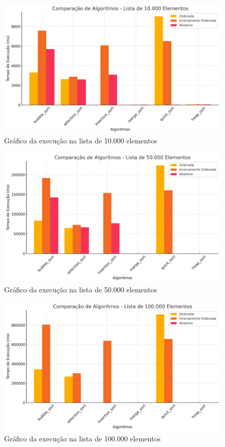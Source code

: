 \documentclass[tcc2]{uftex}
\begin{document}
\begin{figure}[!h]
    \centering
    \includegraphics[width=0.8\linewidth]{trabalho/10.000 elementos.png}
    \caption{Gráfico da execução na lista de 10.000 elementos}
    \label{fig:enter-label}
\end{figure}

\begin{figure}[!h]
    \centering
    \includegraphics[width=0.8\linewidth]{trabalho/50.000 elementos.png}
    \caption{Gráfico da execução na lista de 50.000 elementos}
    \label{fig:enter-label}
\end{figure}

\begin{figure}[!h]
    \centering
    \includegraphics[width=0.8\linewidth]{trabalho/100.000 elementos.png}
    \caption{Gráfico da execução na lista de 100.000 elementos}
    \label{fig:enter-label}
\end{figure}
\end{document}
